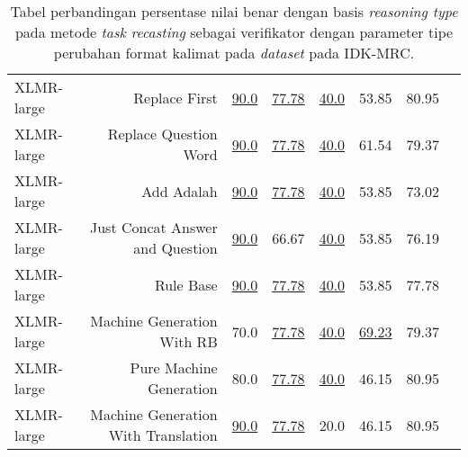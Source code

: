 \begin{table}[H]
\begin{tabular}{lrrrrrrr}
XLMR-large &Replace First &\underline{90.0} &\underline{77.78} &\underline{40.0} &53.85 &80.95 \\
XLMR-large &Replace Question Word &\underline{90.0} &\underline{77.78} &\underline{40.0} &61.54 &79.37 \\
XLMR-large &Add Adalah &\underline{90.0} &\underline{77.78} &\underline{40.0} &53.85 &73.02 \\
XLMR-large &Just Concat Answer and Question &\underline{90.0} &66.67 &\underline{40.0} &53.85 &76.19 \\
XLMR-large &Rule Base &\underline{90.0} &\underline{77.78} &\underline{40.0} &53.85 &77.78 \\
XLMR-large &Machine Generation With RB &70.0 &\underline{77.78} &\underline{40.0} &\underline{69.23} &79.37 \\
XLMR-large &Pure Machine Generation &80.0 &\underline{77.78} &\underline{40.0} &46.15 &80.95 \\
XLMR-large &Machine Generation With Translation &\underline{90.0} &\underline{77.78} &20.0 &46.15 &80.95 \\
\bottomrule
\end{tabular}
\caption{Tabel perbandingan persentase nilai benar dengan basis \emph{reasoning type} pada metode \emph{task recasting} sebagai verifikator dengan parameter tipe perubahan format kalimat pada \emph{dataset} pada IDK-MRC.}
\end{table}